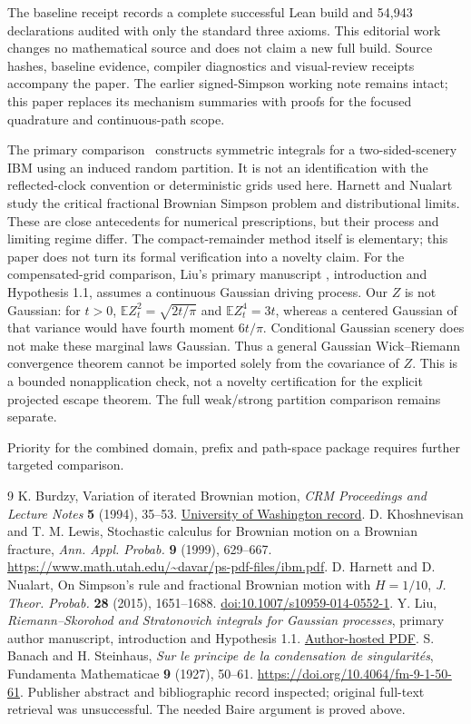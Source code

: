 \documentclass[11pt]{article}
\theoremstyle{remark}\newtheorem{remark}[theorem]{Remark}
\begin{document}
The baseline receipt records a complete successful Lean build
and 54,943 declarations audited with only the standard three
axioms. This editorial work changes no mathematical source and
does not claim a new full build. Source hashes, baseline evidence,
compiler diagnostics and visual-review receipts accompany the
paper. The earlier signed-Simpson working note remains intact;
this paper replaces its mechanism summaries with proofs for the
focused quadrature and continuous-path scope.

The primary comparison~\cite{kl} constructs symmetric integrals
for a two-sided-scenery IBM using an induced random partition.
It is not an identification with the reflected-clock convention
or deterministic grids used here. Harnett and Nualart~\cite{hn}
study the critical fractional Brownian Simpson problem and
distributional limits. These are close antecedents for numerical
prescriptions, but their process and limiting regime differ.
The compact-remainder method itself is elementary; this paper
does not turn its formal verification into a novelty claim.
For the compensated-grid comparison, Liu's primary manuscript
\cite{liu}, introduction and Hypothesis 1.1, assumes a continuous
Gaussian driving process. Our $Z$ is not Gaussian: for $t>0$,
$\mathbb E Z_t^2=\sqrt{2t/\pi}$ and $\mathbb E Z_t^4=3t$,
whereas a centered Gaussian of that variance would have fourth moment
$6t/\pi$. Conditional Gaussian scenery does not make these marginal
laws Gaussian. Thus a general Gaussian Wick--Riemann convergence
theorem cannot be imported solely from the covariance of $Z$.
This is a bounded nonapplication check, not a novelty certification
for the explicit projected escape theorem. The full weak/strong
partition comparison remains separate.

Priority for the combined domain, prefix and path-space package
requires further targeted comparison.

\begin{thebibliography}{9}
 K. Burdzy,
Variation of iterated Brownian motion,
\emph{CRM Proceedings and Lecture Notes} \textbf{5} (1994), 35--53.
\href{https://hdl.handle.net/1773/2252}{University of Washington record}.
 D. Khoshnevisan and T. M. Lewis,
Stochastic calculus for Brownian motion on a Brownian fracture,
\emph{Ann. Appl. Probab.} \textbf{9} (1999), 629--667.
\url{https://www.math.utah.edu/~davar/ps-pdf-files/ibm.pdf}.
 D. Harnett and D. Nualart,
On Simpson's rule and fractional Brownian motion with $H=1/10$,
\emph{J. Theor. Probab.} \textbf{28} (2015), 1651--1688.
\href{https://doi.org/10.1007/s10959-014-0552-1}{doi:10.1007/s10959-014-0552-1}.
 Y. Liu,
\emph{Riemann--Skorohod and Stratonovich integrals for Gaussian processes},
primary author manuscript, introduction and Hypothesis 1.1.
\href{https://files.blogs.baruch.cuny.edu/wp-content/blogs.dir/8996/files/2025/02/Skorohod-Riemann.pdf}{Author-hosted PDF}.
 S. Banach and H. Steinhaus,
\emph{Sur le principe de la condensation de singularit\'es},
Fundamenta Mathematicae \textbf{9} (1927), 50--61.
\url{https://doi.org/10.4064/fm-9-1-50-61}.
Publisher abstract and bibliographic record inspected; original full-text
retrieval was unsuccessful. The needed Baire argument is proved above.
\end{thebibliography}
\end{document}
